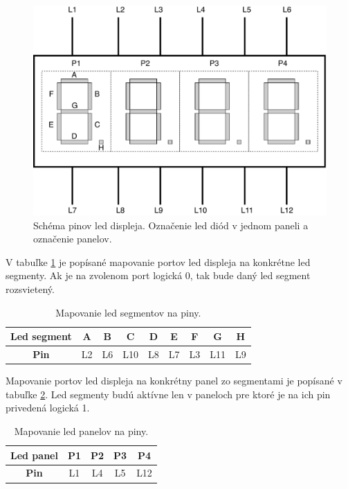 \documentclass[a4paper, 10pt]{article}
\begin{document}
\begin{figure}[H] 
	\centering
	\includegraphics[width=.8\paperwidth]{led_display_scheme.pdf}
	\caption{Schéma pinov led displeja. Označenie led diód v jednom paneli a označenie panelov.}
	\label{led_scheme}
\end{figure}

V tabuľke \ref{tab:map_led_segment} je popísané mapovanie portov led displeja na konkrétne led segmenty. Ak je na zvolenom port logická 0, tak bude daný led segment rozsvietený. 

\begin{table}[H]
	\centering
	\begin{tabular}{|c|c|c|c|c|c|c|c|c|}
		\hline
		\textbf{Led segment} & A & B & C & D & E & F & G & H \\ \hline
		\textbf{Pin} & L2 & L6 & L10 & L8 & L7 & L3 & L11 & L9 \\ \hline
	\end{tabular}
	\caption{Mapovanie led segmentov na piny.}
	\label{tab:map_led_segment}
\end{table}

Mapovanie portov led displeja na konkrétny panel zo segmentami je popísané v tabuľke \ref{tab:map_led_panel}. Led segmenty budú aktívne len v paneloch pre ktoré je na ich pin privedená logická 1.

\begin{table}[H]
	\centering
	\begin{tabular}{|c|c|c|c|c|}
		\hline
		\textbf{Led panel} & P1 & P2 & P3 & P4 \\ \hline
		\textbf{Pin} & L1 & L4 & L5 & L12 \\ \hline
	\end{tabular}
	\caption{Mapovanie led panelov na piny.}
	\label{tab:map_led_panel}
\end{table}
\end{document}
